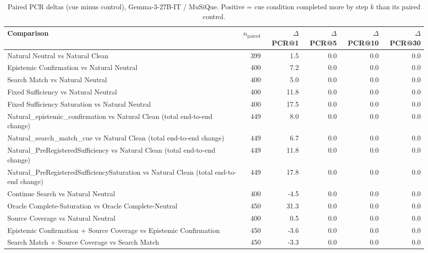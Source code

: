 \begin{table}[t]
\centering
\caption{Paired PCR deltas (cue minus control), Gemma-3-27B-IT / MuSiQue. Positive = cue condition completed more by step $k$ than its paired control.}
\begin{tabular}{lrrrrr}
\toprule
Comparison & $n_{\text{paired}}$ & $\Delta$PCR@1 & $\Delta$PCR@5 & $\Delta$PCR@10 & $\Delta$PCR@30 \\
\midrule
Natural Neutral vs Natural Clean & 399 & 1.5 & 0.0 & 0.0 & 0.0 \\
Epistemic Confirmation vs Natural Neutral & 400 & 7.2 & 0.0 & 0.0 & 0.0 \\
Search Match vs Natural Neutral & 400 & 5.0 & 0.0 & 0.0 & 0.0 \\
Fixed Sufficiency vs Natural Neutral & 400 & 11.8 & 0.0 & 0.0 & 0.0 \\
Fixed Sufficiency Saturation vs Natural Neutral & 400 & 17.5 & 0.0 & 0.0 & 0.0 \\
Natural\_epistemic\_confirmation vs Natural Clean (total end-to-end change) & 449 & 8.0 & 0.0 & 0.0 & 0.0 \\
Natural\_search\_match\_cue vs Natural Clean (total end-to-end change) & 449 & 6.7 & 0.0 & 0.0 & 0.0 \\
Natural\_PreRegisteredSufficiency vs Natural Clean (total end-to-end change) & 449 & 11.8 & 0.0 & 0.0 & 0.0 \\
Natural\_PreRegisteredSufficiencySaturation vs Natural Clean (total end-to-end change) & 449 & 17.8 & 0.0 & 0.0 & 0.0 \\
Continue Search vs Natural Neutral & 400 & -4.5 & 0.0 & 0.0 & 0.0 \\
Oracle Complete-Saturation vs Oracle Complete-Neutral & 450 & 31.3 & 0.0 & 0.0 & 0.0 \\
Source Coverage vs Natural Neutral & 400 & 0.5 & 0.0 & 0.0 & 0.0 \\
Epistemic Confirmation + Source Coverage vs Epistemic Confirmation & 450 & -3.6 & 0.0 & 0.0 & 0.0 \\
Search Match + Source Coverage vs Search Match & 450 & -3.3 & 0.0 & 0.0 & 0.0 \\
\bottomrule
\end{tabular}
\end{table}

